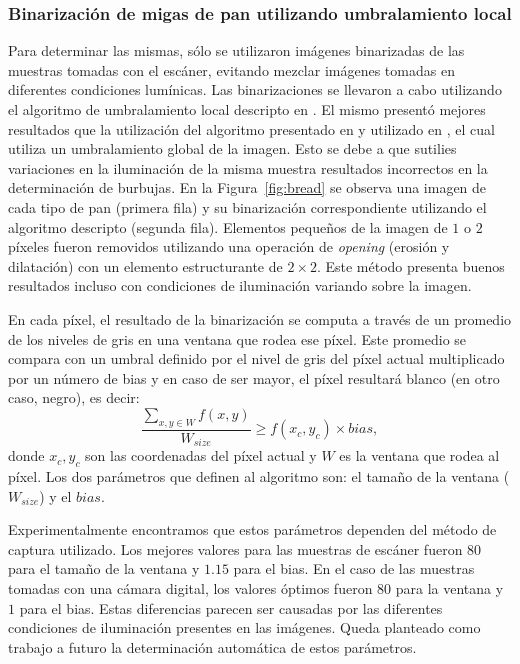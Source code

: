 \documentclass[spanish,a4paper,11pt,oneside,links]{report}
\begin{document}
\subsubsection{Binarización de migas de pan utilizando umbralamiento local}
Para determinar las mismas, sólo se utilizaron imágenes binarizadas de las muestras tomadas con el escáner, evitando mezclar imágenes tomadas en diferentes condiciones lumínicas. Las binarizaciones se llevaron a cabo utilizando el algoritmo de umbralamiento local descripto en \cite{White83}. El mismo presentó mejores resultados que la utilización del algoritmo presentado en \cite{Huang95} y utilizado en \cite{Gonzales2008}, el cual utiliza un umbralamiento global de la imagen. Esto se debe a que sutilies variaciones en la iluminación de la misma muestra resultados incorrectos en la determinación de burbujas. En la Figura~\ref{fig:bread} se observa una imagen de cada tipo de pan (primera fila) y su binarización correspondiente utilizando el algoritmo descripto (segunda fila). Elementos pequeños de la imagen de $1$ o $2$ píxeles fueron removidos utilizando una operación de {\em opening} (erosión y dilatación) con un elemento estructurante de $2\times 2$. Este método presenta buenos resultados incluso con condiciones de iluminación variando sobre la imagen.

En cada píxel, el resultado de la binarización se computa a través de un promedio de los niveles de gris en una ventana que rodea ese píxel. Este promedio se compara con un umbral definido por el nivel de gris del píxel actual multiplicado por un número de bias y en caso de ser mayor, el píxel resultará blanco (en otro caso, negro), es decir:
\begin{equation}
\frac{\sum_{x,y \in W} f(x,y) }{W_{size}} \geq f(x_{c},y_{c}) \times bias,
\label{eqn:white}
\end{equation}
donde $x_{c},y_{c}$ son las coordenadas del píxel actual y  $W$ es la ventana que rodea al píxel. Los dos parámetros que definen al algoritmo son: el tamaño de la ventana ($W_{size}$) y el $bias$. 

Experimentalmente encontramos que estos parámetros dependen del método de captura utilizado. Los mejores valores para las muestras de escáner fueron $80$ para el tamaño de la ventana y $1.15 $ para el bias. En el caso de las muestras tomadas con una cámara digital, los valores óptimos fueron $80$ para la ventana y $1$ para el bias.  Estas diferencias parecen ser causadas por las diferentes condiciones de iluminación presentes en las imágenes. Queda planteado como trabajo a futuro la determinación automática de estos parámetros.
\end{document}
